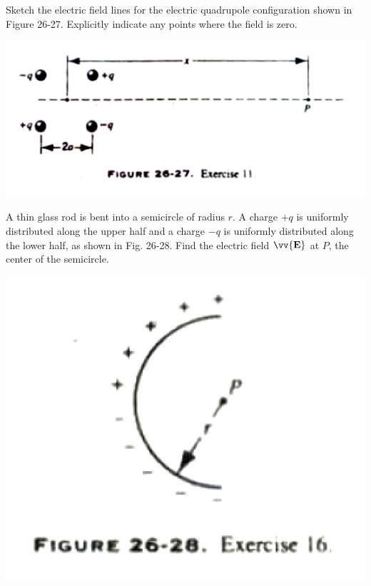 \documentclass[11pt,letterpaper,boxed]{hmcpset}
\begin{document}
	\begin{solution}
		\vfill
	\end{solution}
	\newpage
	
	
	\begin{problem}[Problem 2]
		Sketch the electric field lines for the electric quadrupole configuration shown in Figure 26-27. Explicitly indicate any points where the field is zero.
		\begin{center}
			\includegraphics[scale=0.5]{26-27.png}
		\end{center}
		
		
	\end{problem}
	
	\begin{solution}
		\vfill
	\end{solution}
	\newpage
	
	
	\begin{problem}[HRK E26.16]
		A thin glass rod is bent into a semicircle of radius $r$. A charge $+q$ is uniformly distributed along the upper half and a charge $-q$ is uniformly distributed along the lower half, as shown in Fig. 26-28. Find the electric field $\vv{\textbf{E}}$ at $P$, the center of the semicircle.
		
		\begin{center}
			\includegraphics[scale=0.6]{26-28.png}
		\end{center}
			
	\end{problem}
	
\end{document}
